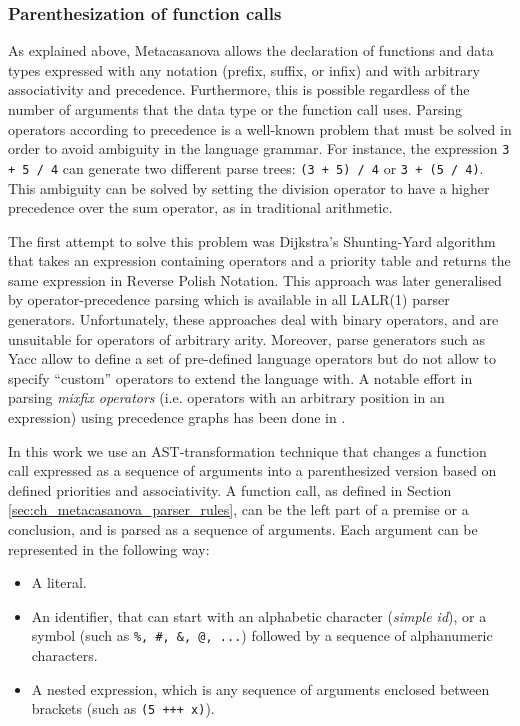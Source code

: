 \subsubsection{Parenthesization of function calls}
As explained above, Metacasanova allows the declaration of functions and data types expressed with any notation (prefix, suffix, or infix) and with arbitrary associativity and precedence. Furthermore, this is possible regardless of the number of arguments that the data type or the function call uses. Parsing operators according to precedence is a well-known problem that must be solved in order to avoid ambiguity in the language grammar. For instance, the expression \texttt{3 + 5 / 4} can generate two different parse trees: \texttt{(3 + 5) / 4} or \texttt{3 + (5 / 4)}. This ambiguity can be solved by setting the division operator to have a higher precedence over the sum operator, as in traditional arithmetic.

The first attempt to solve this problem was Dijkstra's Shunting-Yard algorithm \cite{dijkstra1961shuntingyard} that takes an expression containing operators and a priority table and returns the same expression in Reverse Polish Notation. This approach was later generalised by operator-precedence parsing which is available in all LALR(1) parser generators. Unfortunately, these approaches deal with binary operators, and are unsuitable for operators of arbitrary arity. Moreover, parse generators such as Yacc allow to define a set of pre-defined language operators but do not allow to specify ``custom'' operators to extend the language with. A notable effort in parsing \textit{mixfix operators} (i.e. operators with an arbitrary position in an expression) using precedence graphs has been done in \cite{danielsson2008parsing}.

In this work we use an AST-transformation technique that changes a function call expressed as a sequence of arguments into a parenthesized version based on defined priorities and associativity. A function call, as defined in Section \ref{sec:ch_metacasanova_parser_rules}, can be the left part of a premise or a conclusion, and is parsed as a sequence of arguments. Each argument can be represented in the following way:

\begin{itemize}[noitemsep]
	\item A literal.
	\item An identifier, that can start with an alphabetic character (\textit{simple id}), or a symbol (such as \texttt{\%, \#, \&, @, ...}) followed by a sequence of alphanumeric characters.
	\item A nested expression, which is any sequence of arguments enclosed between brackets (such as \texttt{(5 +++ x)}).	
\end{itemize}

